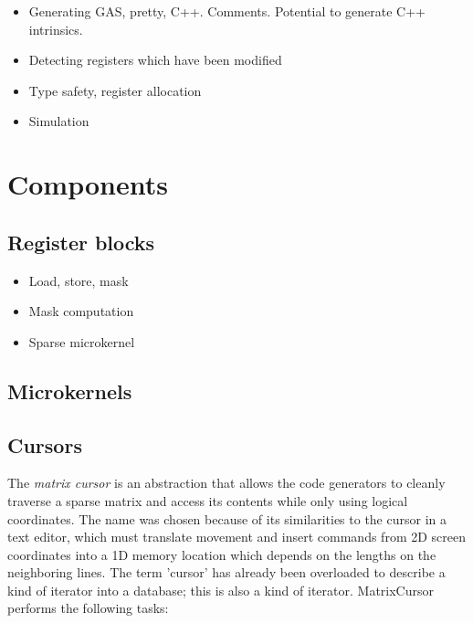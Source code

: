 \begin{itemize}
  \item Generating GAS, pretty, C++. Comments. Potential to generate C++ intrinsics.
  \item Detecting registers which have been modified
  \item Type safety, register allocation
  \item Simulation
\end{itemize}



\section{Components}

\subsection{Register blocks}
\begin{itemize}
  \item Load, store, mask
  \item Mask computation
  \item Sparse microkernel
\end{itemize}

\subsection{Microkernels}

\subsection{Cursors}

    The \emph{matrix cursor} is an abstraction that allows the code generators to cleanly traverse a sparse matrix and access its contents while only using logical coordinates. The name was chosen because of its similarities to the cursor in a text editor, which must translate movement and insert commands from 2D screen coordinates into a 1D memory location which depends on the lengths on the neighboring lines. The term 'cursor' has already been overloaded to describe a kind of iterator into a database; this is also a kind of iterator. MatrixCursor performs the following tasks:

